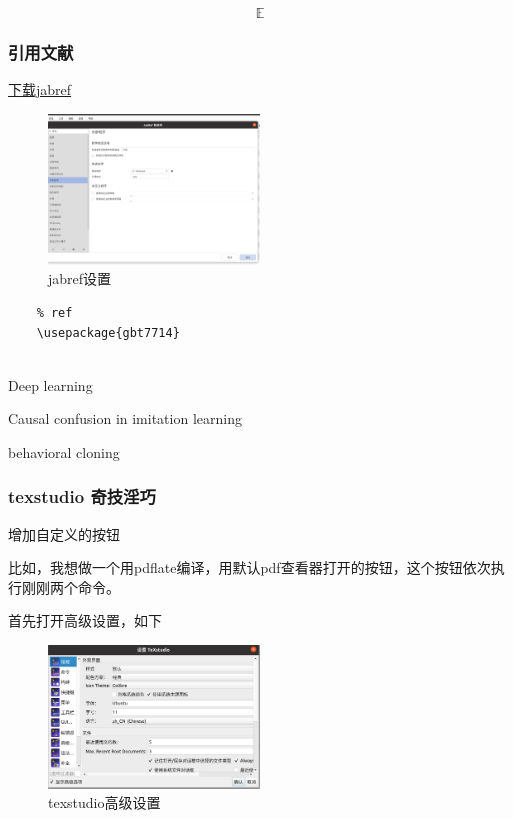\documentclass[11pt]{ctexart}
\newcommand{\EE}{\mathbb{E}}
\begin{document}
\begin{equation}
	\EE
\end{equation}
 
 \subsubsection{引用文献}
 
 \href{https://www.jabref.org/}{下载jabref}
 
 \begin{figure}[h]
 	\centering
 	\includegraphics[width=0.5\textwidth]{images/jabref_set.png}
 	\caption{jabref设置}
 	
 \end{figure}
 
 \begin{lstlisting}
 	% ref
 	\usepackage{gbt7714}
 	
 \end{lstlisting}
 
 Deep learning\cite{lecun2015deep}
 
 Causal confusion in imitation learning\cite{de2019causal}
 
 behavioral cloning\cite{wen2020fighting}
 
 \subsubsection{texstudio 奇技淫巧}
 
 增加自定义的按钮
 
 比如，我想做一个用pdflate编译，用默认pdf查看器打开的按钮，这个按钮依次执行刚刚两个命令。
 
 首先打开高级设置，如下
 
  \begin{figure}[h]
 	\centering
 	\includegraphics[width=0.5\textwidth]{images/texstudio_set.png}
 	\caption{texstudio高级设置}
 	
 \end{figure}
\end{document}
